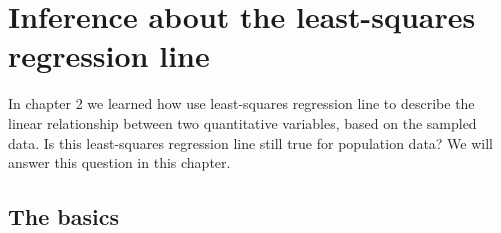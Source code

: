 \documentclass[a4paper, 12pt,twoside]{book}
\begin{document}
\pagestyle{fancy}
\fancyhf{}
\renewcommand{\chaptermark}[1]{ \markboth{#1}{} }
\fancyhead[CE,CO]{\leftmark}
\fancyfoot[LE,RO]{\thepage}
\chapter{Inference about the least-squares regression line}

In chapter 2 we learned how use least-squares regression line to describe the linear relationship between two quantitative variables, based on the sampled data. Is this least-squares regression line still true for population data?  We will answer this question in this chapter.
\newpage

\section{The basics}
\end{document}
